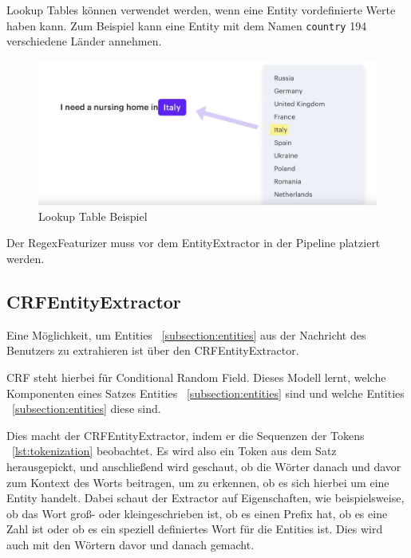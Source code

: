 Lookup Tables können verwendet werden, wenn eine Entity vordefinierte Werte haben kann.
Zum Beispiel kann eine Entity mit dem Namen \texttt{country} 194 verschiedene Länder annehmen.\cite{rasaMasterclassRegexFeaturizer, pipelineComponentsYoutube, regexFeaturizerCrf}

\begin{figure}[hbt!]
    \centering
    \includegraphics[scale=0.25]{pics/lookup-table-example}
    \caption{Lookup Table Beispiel~\cite{pipelineComponentsYoutube}}
    \label{fig:Lookup Table Beispiel}
\end{figure}

Der RegexFeaturizer muss vor dem EntityExtractor in der Pipeline platziert werden.\cite{rasaMasterclassRegexFeaturizer, pipelineComponentsYoutube, regexFeaturizerCrf}

\subsection{CRFEntityExtractor}\label{subsec:crfentityextractor}

Eine Möglichkeit, um Entities ~\ref{subsection:entities} aus der Nachricht des Benutzers zu extrahieren ist über den CRFEntityExtractor.\cite{crfEntityExtractor}

CRF steht hierbei für Conditional Random Field.
Dieses Modell lernt, welche Komponenten eines Satzes Entities ~\ref{subsection:entities} sind und welche Entities ~\ref{subsection:entities} diese sind.\cite{crfEntityExtractor, pipelineComponentsYoutube, regexFeaturizerCrf}

Dies macht der CRFEntityExtractor, indem er die Sequenzen der Tokens ~\ref{lst:tokenization} beobachtet.
Es wird also ein Token aus dem Satz herausgepickt, und anschließend wird geschaut, ob die Wörter danach und davor zum Kontext des Worts beitragen, um zu erkennen, ob es sich hierbei um eine Entity handelt.
Dabei schaut der Extractor auf Eigenschaften, wie beispielsweise, ob das Wort groß- oder kleingeschrieben ist, ob es einen Prefix hat, ob es eine Zahl ist oder ob es ein speziell definiertes Wort für die Entities ist.
Dies wird auch mit den Wörtern davor und danach gemacht.\cite{crfEntityExtractor, pipelineComponentsYoutube, regexFeaturizerCrf}

